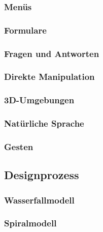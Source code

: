 \documentclass[a4paper, 11pt, accentcolor = tud3b]{tudreport}
\begin{document}
				\subsubsection{Menüs} %

				\subsubsection{Formulare} %

				\subsubsection{Fragen und Antworten} %

				\subsubsection{Direkte Manipulation} %

				\subsubsection{3D-Umgebungen} %

				\subsubsection{Natürliche Sprache} %

				\subsubsection{Gesten} %

			\subsection{Designprozess} %

				\subsubsection{Wasserfallmodell} %

				\subsubsection{Spiralmodell} %
\end{document}
